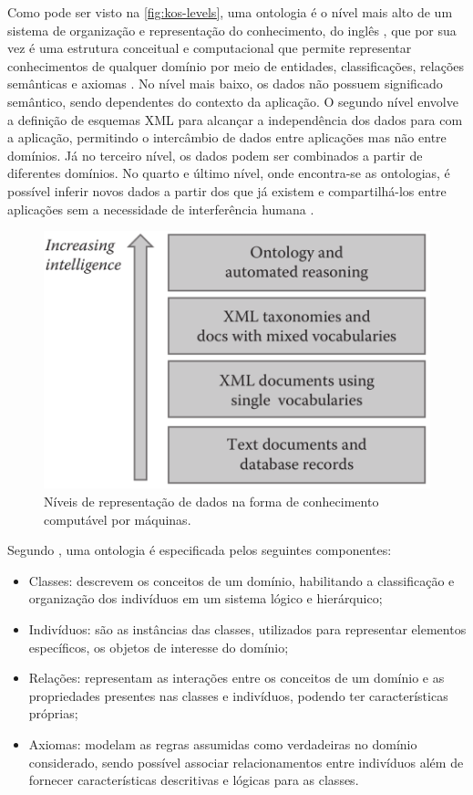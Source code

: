     	Como pode ser visto na \autoref{fig:kos-levels}, uma ontologia é o nível mais alto de um sistema de organização e representação do conhecimento, do inglês , que por sua vez é uma estrutura conceitual e computacional que permite representar conhecimentos de qualquer domínio por meio de entidades, classificações, relações semânticas e axiomas \cite{Cheng2016}. No nível mais baixo, os dados não possuem significado semântico, sendo dependentes do contexto da aplicação. O segundo nível envolve a definição de esquemas XML para alcançar a independência dos dados para com a aplicação, permitindo o intercâmbio de dados entre aplicações mas não entre domínios. Já no terceiro nível, os dados podem ser combinados a partir de diferentes domínios. No quarto e último nível, onde encontra-se as ontologias, é possível inferir novos dados a partir dos que já existem e compartilhá-los entre aplicações sem a necessidade de interferência humana \cite{9781439801567}.
        
        \begin{figure}[htbp]
        	\centering
        	\caption{Níveis de representação de dados na forma de conhecimento computável por máquinas.}
            \label{fig:kos-levels}
            \includegraphics[width=0.7\linewidth]{images/kos-levels}
        \end{figure}
        
        Segundo , uma ontologia é especificada pelos seguintes componentes:
        
        \begin{itemize}
        	\item Classes: descrevem os conceitos de um domínio, habilitando a classificação e organização dos indivíduos em um sistema lógico e hierárquico;
            \item Indivíduos: são as instâncias das classes, utilizados para representar elementos específicos, os objetos de interesse do domínio;
            \item Relações: representam as interações entre os conceitos de um domínio e as propriedades presentes nas classes e indivíduos, podendo ter características próprias; 
            \item Axiomas: modelam as regras assumidas como verdadeiras no domínio considerado, sendo possível associar relacionamentos entre indivíduos além de fornecer características descritivas e lógicas para as classes.
        \end{itemize}
        
